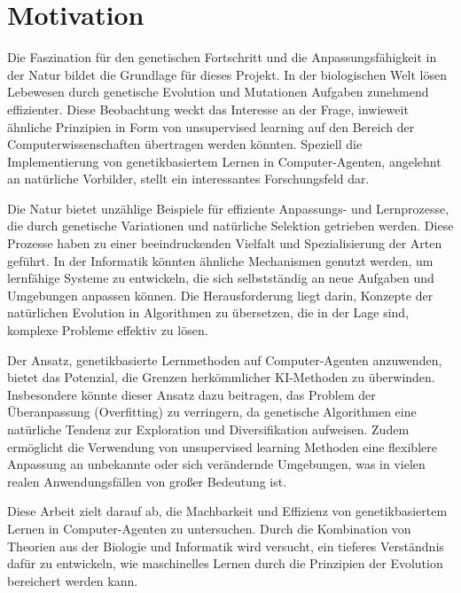 \chapter{Motivation}
\label{chapter:1}
Die Faszination für den genetischen Fortschritt und die Anpassungsfähigkeit in der Natur bildet die Grundlage für dieses Projekt. In der biologischen Welt lösen Lebewesen durch genetische Evolution und Mutationen Aufgaben zunehmend effizienter. Diese Beobachtung weckt das Interesse an der Frage, inwieweit ähnliche Prinzipien in Form von unsupervised learning auf den Bereich der Computerwissenschaften übertragen werden könnten. Speziell die Implementierung von genetikbasiertem Lernen in Computer-Agenten, angelehnt an natürliche Vorbilder, stellt ein interessantes Forschungsfeld dar.

Die Natur bietet unzählige Beispiele für effiziente Anpassungs- und Lernprozesse, die durch genetische Variationen und natürliche Selektion getrieben werden. Diese Prozesse haben zu einer beeindruckenden Vielfalt und Spezialisierung der Arten geführt. In der Informatik könnten ähnliche Mechanismen genutzt werden, um lernfähige Systeme zu entwickeln, die sich selbstständig an neue Aufgaben und Umgebungen anpassen können. Die Herausforderung liegt darin, Konzepte der natürlichen Evolution in Algorithmen zu übersetzen, die in der Lage sind, komplexe Probleme effektiv zu lösen.

Der Ansatz, genetikbasierte Lernmethoden auf Computer-Agenten anzuwenden, bietet das Potenzial, die Grenzen herkömmlicher KI-Methoden zu überwinden. Insbesondere könnte dieser Ansatz dazu beitragen, das Problem der Überanpassung (Overfitting) zu verringern, da genetische Algorithmen eine natürliche Tendenz zur Exploration und Diversifikation aufweisen. Zudem ermöglicht die Verwendung von unsupervised learning Methoden eine flexiblere Anpassung an unbekannte oder sich verändernde Umgebungen, was in vielen realen Anwendungsfällen von großer Bedeutung ist.

Diese Arbeit zielt darauf ab, die Machbarkeit und Effizienz von genetikbasiertem Lernen in Computer-Agenten zu untersuchen. Durch die Kombination von Theorien aus der Biologie und Informatik wird versucht, ein tieferes Verständnis dafür zu entwickeln, wie maschinelles Lernen durch die Prinzipien der Evolution bereichert werden kann. 





